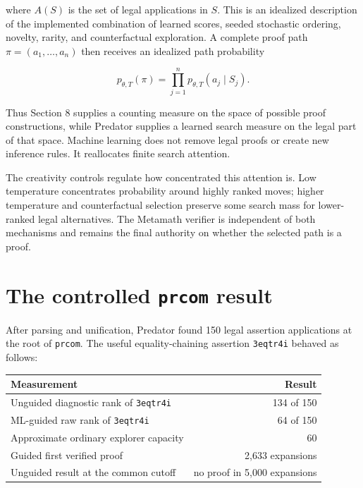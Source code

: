 \documentclass[11pt]{article}
\newcommand{\prcom}{\texttt{prcom}}
\begin{document}
where $A(S)$ is the set of legal applications in $S$.  This is an
idealized description of the implemented combination of learned
scores, seeded stochastic ordering, novelty, rarity, and
counterfactual exploration.  A complete proof path
$\pi=(a_1,\ldots,a_n)$ then receives an idealized path probability

\begin{equation}
p_{\theta,T}(\pi)
=
\prod_{j=1}^{n}p_{\theta,T}(a_j\mid S_j).
\label{eq:path-probability}
\end{equation}

Thus Section 8 supplies a counting measure on the space of possible
proof constructions, while Predator supplies a learned search measure
on the legal part of that space.  Machine learning does not remove
legal proofs or create new inference rules.  It reallocates finite
search attention.

The creativity controls regulate how concentrated this attention is.
Low temperature concentrates probability around highly ranked moves;
higher temperature and counterfactual selection preserve some search
mass for lower-ranked legal alternatives.  The Metamath verifier is
independent of both mechanisms and remains the final authority on
whether the selected path is a proof.

\section{The controlled \prcom{} result}

After parsing and unification, Predator found 150 legal assertion
applications at the root of \prcom.  The useful equality-chaining
assertion \texttt{3eqtr4i} behaved as follows:

\begin{center}
\begin{tabular}{@{}lr@{}}
\toprule
Measurement & Result \\
\midrule
Unguided diagnostic rank of \texttt{3eqtr4i} & 134 of 150 \\
ML-guided raw rank of \texttt{3eqtr4i} & 64 of 150 \\
Approximate ordinary explorer capacity & 60 \\
Guided first verified proof & 2,633 expansions \\
Unguided result at the common cutoff & no proof in 5,000 expansions \\
\bottomrule
\end{tabular}
\end{center}
\end{document}
